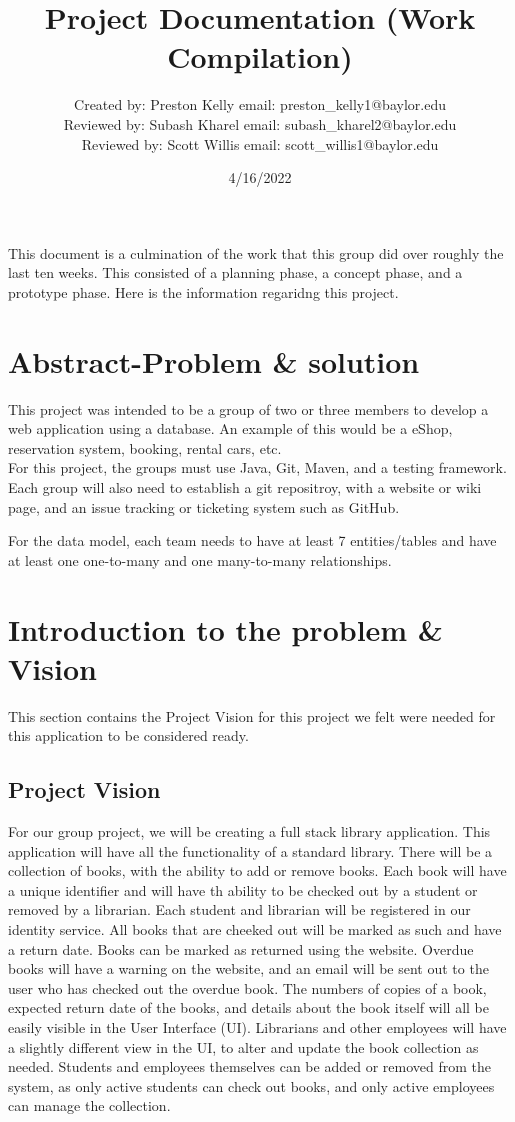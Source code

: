 \documentclass{article}
\title{Project Documentation (Work Compilation)}
\date{4/16/2022}
\author{Created by: Preston Kelly email: preston\_kelly1@baylor.edu \\
	Reviewed by: Subash Kharel email: subash\_kharel2@baylor.edu \\
	Reviewed by: Scott Willis email: scott\_willis1@baylor.edu
}
\begin{document}
	
	\maketitle
	
	This document is a culmination of the work that this group did over roughly the last ten weeks. This consisted of a planning phase, a concept phase, and a prototype phase. Here is the information regaridng this project.
	
	\section{Abstract-Problem \& solution}
	
	This project was intended to be a group of two or three members to develop a web application using a database. An example of this would be a eShop, reservation system, booking, rental cars, etc. \\
	
	For this project, the groups must use Java, Git, Maven, and a testing framework. Each group will also need to establish a git repositroy, with a website or wiki page, and an issue tracking or ticketing system such as GitHub.
	
	For the data model, each team needs to have at least 7 entities/tables and have at least one one-to-many and one many-to-many relationships.
	
	\section{Introduction to the problem \& Vision}
	
	This section contains the Project Vision for this project we felt were needed for this application to be considered ready.
	
	\subsection{Project Vision}
	
	For our group project, we will be creating a full stack library application. This application will have all the functionality of a standard library. There will be a collection of books, with the ability to add or remove books. Each book will have a unique identifier and will have th ability to be checked out by a student or removed by a librarian. Each student and librarian will be registered in our identity service. All books that are cheeked out will be marked as such and have a return date. Books can be marked as returned using the website. Overdue books will have a warning on the website, and an email will be sent out to the user who has checked out the overdue book. The numbers of copies of a book, expected return date of the books, and details about the book itself will all be easily visible in the User Interface (UI). Librarians and other employees will have a slightly different view in the UI, to alter and update the book collection as needed. Students and employees themselves can be added or removed from the system, as only active students can check out books, and only active employees can manage the collection.
		
\end{document}
